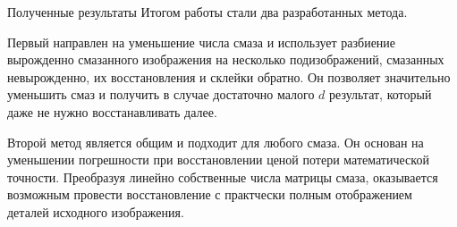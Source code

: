 \documentclass[10pt]{beamer}
\begin{document}
\begin{frame}

\begin{block}{{\LARGE Полученные результаты}}
Итогом работы стали два разработанных метода.


Первый направлен на уменьшение числа смаза и использует разбиение вырожденно смазанного изображения на несколько подизображений, смазанных невырожденно, их восстановления и склейки обратно. Он позволяет значительно уменьшить смаз и получить в случае достаточно малого $d$ результат, который даже не нужно восстанавливать далее.


Второй метод является общим и подходит для любого смаза. Он основан на уменьшении погрешности при восстановлении ценой потери математической точности. Преобразуя линейно собственные числа матрицы смаза, оказывается возможным провести восстановление с практчески полным отображением деталей исходного изображения.
\end{block}

\end{frame}
\end{document}
